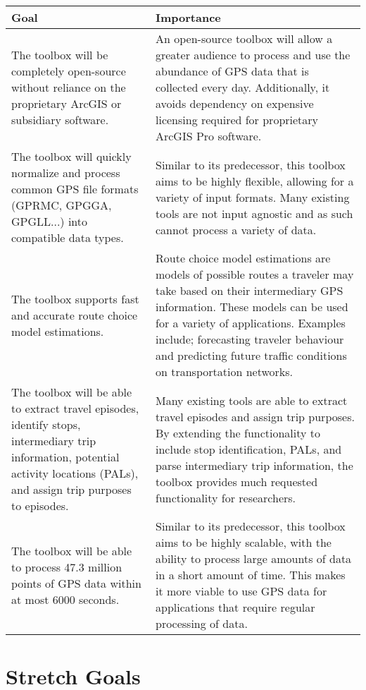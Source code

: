 \documentclass{article}
\begin{document}
\begin{table}[h!]
    \centering
        \begin{tabular}{|p{6cm}|p{6cm}|}
    		\hline
    		\textbf{Goal} & \textbf{Importance} \\
    		\hline
    		The toolbox will be completely open-source without reliance on the proprietary ArcGIS or subsidiary software. & An open-source toolbox will allow a greater audience to process and use the abundance of GPS data that is collected every day. Additionally, it avoids dependency on expensive licensing required for proprietary ArcGIS Pro software. \\
    		\hline
    		The toolbox will quickly normalize and process common GPS file formats (GPRMC, GPGGA, GPGLL...) into compatible data types. & Similar to its predecessor, this toolbox aims to be highly flexible, allowing for a variety of input formats. Many existing tools are not input agnostic and as such cannot process a variety of data.  \\
    		\hline
    		The toolbox supports fast and accurate route choice model estimations. & Route choice model estimations are models of possible routes a traveler may take based on their intermediary GPS information. These models can be used for a variety of applications. Examples include; forecasting traveler behaviour and predicting future traffic conditions on transportation networks. \\
    		\hline
    		The toolbox will be able to extract travel episodes, identify stops, intermediary trip information, potential activity locations (PALs), and assign trip purposes to episodes. & Many existing tools are able to extract travel episodes and assign trip purposes. By extending the functionality to include stop identification, PALs, and parse intermediary trip information, the toolbox provides much requested functionality for researchers. \\
    		\hline
    		The toolbox will be able to process 47.3 million points of GPS data within at most 6000 seconds. & Similar to its predecessor, this toolbox aims to be highly scalable, with the ability to process large amounts of data in a short amount of time. This makes it more viable to use GPS data for applications that require regular processing of data.\\
    		\hline
    	\end{tabular}
		
\end{table}


\section{Stretch Goals}
\end{document}
